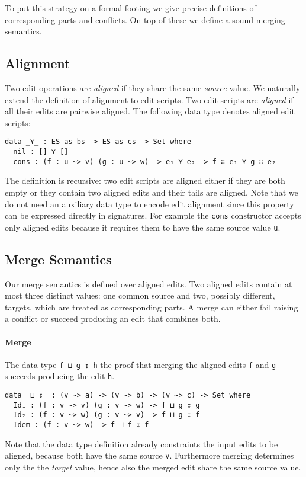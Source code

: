 \documentclass[preprint]{sigplanconf}
\begin{document}
	To put this strategy on a formal footing we give precise definitions
	of corresponding parts and conflicts.
	On top of these we define a sound merging semantics.

	\subsection{Alignment}
	Two edit operations are \emph{aligned} if they share the same 
	\emph{source} value. We naturally extend the definition of alignment to edit 
	scripts.	Two edit scripts are \emph{aligned} if all their edits are pairwise 
	aligned. The following data type denotes aligned edit scripts:	
\begin{verbatim}
data _⋎_ : ES as bs -> ES as cs -> Set where
  nil : [] ⋎ []
  cons : (f : u ~> v) (g : u ~> w) -> e₁ ⋎ e₂ -> f ∷ e₁ ⋎ g ∷ e₂ 
\end{verbatim}
	The definition is recursive: two edit scripts are aligned either if they are
	both empty or they contain two aligned edits and their tails are aligned.
	Note that we do not need an auxiliary data type to encode edit 
	alignment since this property can be expressed directly in signatures.
	For example the \texttt{cons} constructor accepts only aligned edits
	because it requires them to have the same source value \texttt{u}.
	
	\subsection{Merge Semantics}
	Our merge semantics is defined over aligned edits.
	Two aligned edits contain at most three distinct values: 
	one common source and two, 	possibly different, targets, which 
	are treated as corresponding parts.
	A merge can either fail raising a conflict or succeed producing
	an edit that combines both.
	
	\paragraph{Merge}
	The data type \texttt{f ⊔ g ↧ h} the proof that merging the 
	aligned edits \texttt{f} and \texttt{g} succeeds producing the edit \texttt{h}.
	
\begin{verbatim}	
data _⊔_↧_ : (v ~> a) -> (v ~> b) -> (v ~> c) -> Set where
  Id₁ : (f : v ~> v) (g : v ~> w) -> f ⊔ g ↧ g
  Id₂ : (f : v ~> w) (g : v ~> v) -> f ⊔ g ↧ f
  Idem : (f : v ~> w) -> f ⊔ f ↧ f
\end{verbatim}
	Note that the data type definition already constraints the input edits to
	be aligned, because both have the same source \texttt{v}.
	Furthermore merging determines only the the \emph{target} value,
	hence also the merged edit share the same source value.
\end{document}
